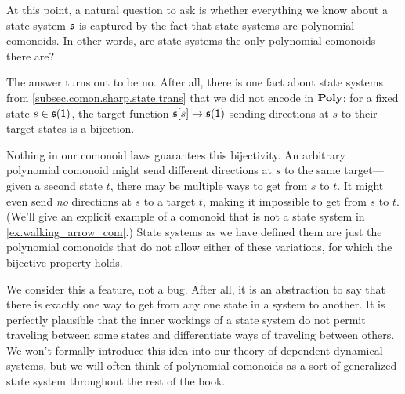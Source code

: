 \documentclass[Book-Poly]{subfiles}
\begin{document}
\begin{example} \label{ex.not_all_com_state}
At this point, a natural question to ask is whether everything we know about a state system $\mathfrak{s}$ is captured by the fact that state systems are polynomial comonoids.
In other words, are state systems the only polynomial comonoids there are?

The answer turns out to be no.
After all, there is one fact about state systems from \cref{subsec.comon.sharp.state.trans} that we did not encode in $\mathbf{Poly}$: for a fixed state $s\in\mathfrak{s}(\textsf{1})$, the target function $\mathfrak{s}[s]\to\mathfrak{s}(\textsf{1})$ sending directions at $s$ to their target states is a bijection.

Nothing in our comonoid laws guarantees this bijectivity.
An arbitrary polynomial comonoid might send different directions at $s$ to the same target---given a second state $t$, there may be multiple ways to get from $s$ to $t$.
It might even send \emph{no} directions at $s$ to a target $t$, making it impossible to get from $s$ to $t$.
(We'll give an explicit example of a comonoid that is not a state system in \cref{ex.walking_arrow_com}.)
State systems as we have defined them are just the polynomial comonoids that do not allow either of these variations, for which the bijective property holds.

We consider this a feature, not a bug.
After all, it is an abstraction to say that there is exactly one way to get from any one state in a system to another.
It is perfectly plausible that the inner workings of a state system do not permit traveling between some states and differentiate ways of traveling between others.
We won't formally introduce this idea into our theory of dependent dynamical systems,
but we will often think of polynomial comonoids as a sort of generalized state system throughout the rest of the book.
\end{example}
\end{document}
